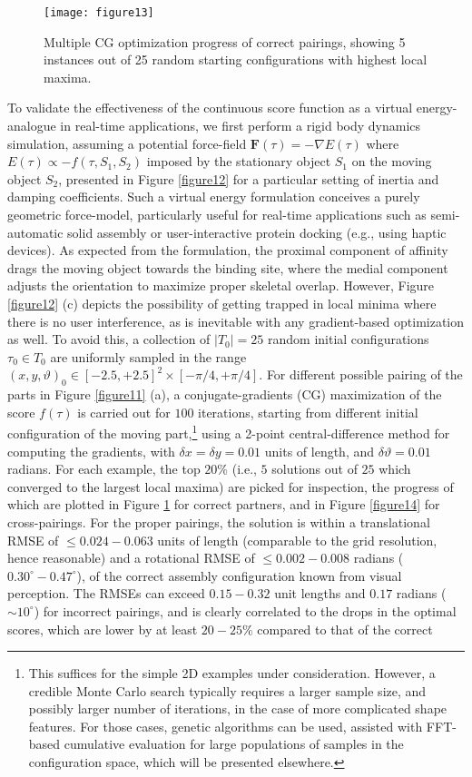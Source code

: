 \documentclass[article]{gmp2014}
\theoremstyle{definition}
\begin{document}
%
\begin{figure}
    \centering
    \texttt{[image: figure13]}
    \caption{Multiple CG optimization progress of correct pairings, showing 5 instances out of 25 random starting configurations with highest local maxima.} \label{figure13}
\end{figure}
%

To validate the effectiveness of the continuous score function as a virtual energy-analogue in real-time applications, we first perform a rigid body dynamics simulation, assuming a potential force-field $\mathbf{F}(\tau) = -\nabla E(\tau)$ where $E(\tau) \propto -f(\tau, S_1, S_2)$ imposed by the stationary object $S_1$ on the moving object $S_2$, presented in Figure \ref{figure12} for a particular setting of inertia and damping coefficients. Such a virtual energy formulation conceives a purely geometric force-model, particularly useful for real-time applications such as semi-automatic solid assembly or user-interactive protein docking (e.g., using haptic devices). As expected from the formulation, the proximal component of affinity drags the moving object towards the binding site, where the medial component adjusts the orientation to maximize proper skeletal overlap. However, Figure \ref{figure12} (c) depicts the possibility of getting trapped in local minima where there is no user interference, as is inevitable with any gradient-based optimization as well. To avoid this, a collection of $|T_0| = 25$ random initial configurations $\tau_0 \in T_0$ are uniformly sampled in the range $(x, y, \vartheta)_0 \in [-2.5, +2.5]^2 \times [-\pi/4, +\pi/4]$. For different possible pairing of the parts in Figure \ref{figure11} (a), a conjugate-gradients (CG) maximization of the score $f(\tau)$ is carried out for $100$ iterations, starting from different initial configuration of the moving part,\footnote{This suffices for the simple 2D examples under consideration. However, a credible Monte Carlo search typically requires a larger sample size, and possibly larger number of iterations, in the case of more complicated shape features. For those cases, genetic algorithms can be used, assisted with FFT-based cumulative evaluation for large populations of samples in the configuration space, which will be presented elsewhere.} using a 2-point central-difference method for computing the gradients, with $\delta x = \delta y = 0.01$ units of length, and $\delta \vartheta = 0.01$ radians. For each example, the top $20\%$ (i.e., $5$ solutions out of $25$ which converged to the largest local maxima) are picked for inspection, the progress of which are plotted in Figure \ref{figure13} for correct partners, and in Figure \ref{figure14} for cross-pairings. For the proper pairings, the solution is within a translational RMSE of $\leq 0.024-0.063$ units of length (comparable to the grid resolution, hence reasonable) and a rotational RMSE of $\leq 0.002-0.008$ radians ($0.30^\circ-0.47^\circ$), of the correct assembly configuration known from visual perception. The RMSEs can exceed $0.15-0.32$ unit lengths and $0.17$ radians ($\sim 10^\circ$) for incorrect pairings, and is clearly correlated to the drops in the optimal scores, which are lower by at least $20-25\%$ compared to that of the correct 
\end{document}
